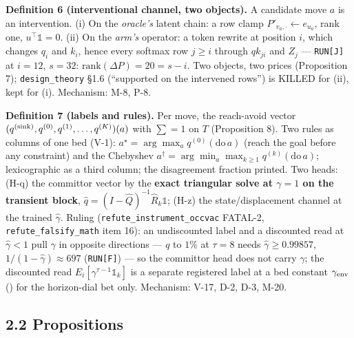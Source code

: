\documentclass[11pt,a4paper]{article}
\theoremstyle{plain}
\theoremstyle{definition}
\theoremstyle{remark}
\begin{document}
\textbf{Definition 6 (interventional channel, two objects).} A candidate
move \(a\) is an intervention. (i) On the \emph{oracle's} latent chain:
a row clamp \(P'_{v_a,\cdot}\leftarrow e_{u_a}\), rank one,
\(u^\top\mathbb 1=0\). (ii) On the \emph{arm's} operator: a token
rewrite at position \(i\), which changes \(q_i\) and \(k_i\), hence
every softmax row \(j\ge i\) through \(qk_{ji}\) and \(Z_j\) ---
\texttt{RUN{[}J{]}} at \(i=12\), \(s=32\):
\(\mathrm{rank}(\Delta P)=20=s-i\). Two objects, two prices (Proposition
7); \texttt{design\_theory} §1.6 (``supported on the intervened rows'')
is KILLED for (ii), kept for (i). Mechanism: M-8, P-8.

\textbf{Definition 7 (labels and rules).} Per move, the reach-avoid
vector \((q^{({\rm sink})},q^{(0)},q^{(1)},\dots,q^{(K)})(a)\) with
\(\sum=1\) on \(T\) (Proposition 8). Two rules as columns of one bed
(V-1): \(a^\star=\arg\max_a q^{(0)}(\mathrm{do}\,a)\) (reach the goal
before any constraint) and the Chebyshev
\(a^\dagger=\arg\min_a\max_{k\ge1}q^{(k)}(\mathrm{do}\,a)\);
lexicographic as a third column; the disagreement fraction printed. Two
heads: (H-q) the committor vector by the \textbf{exact triangular solve
at \(\gamma=1\) on the transient block},
\(\hat q=(I-\hat Q)^{-1}\hat R_k\mathbb 1\); (H-z) the
state/displacement channel at the trained \(\hat\gamma\). Ruling
(\texttt{refute\_instrument\_occvac} FATAL-2,
\texttt{refute\_falsify\_math} item 16): an undiscounted label and a
discounted read at \(\hat\gamma<1\) pull \(\gamma\) in opposite
directions --- \(q\) to \(1\%\) at \(\tau=8\) needs
\(\hat\gamma\ge0.99857\), \(1/(1-\hat\gamma)\approx697\)
(\texttt{RUN{[}F{]}}) --- so the committor head does not carry
\(\gamma\); the discounted read \(E_i[\gamma^{\tau-1}\mathbb 1_k]\) is a
separate registered label at a bed constant \(\gamma_{\rm env}\)
(\citep{fisac-2019-bridging}) for the horizon-dial bet only. Mechanism:
V-17, D-2, D-3, M-20.

\subsection{2.2 Propositions}\label{propositions}
\end{document}
